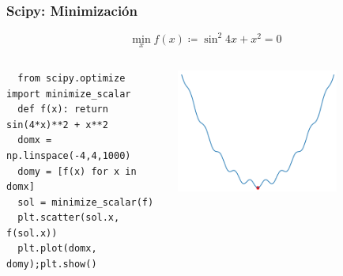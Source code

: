 \documentclass[14pt,aspectratio=169,xcolor=dvipsnames]{beamer}
\begin{document}
\begin{frame}[t,fragile]\frametitle{Scipy: Minimización}
    \begin{small}
    $$ \min_ x f(x) \coloneqq \sin^2 4x + x^2  = 0  $$
    \vspace{-0.5cm}
    \begin{columns}
        \begin{column}{0.49\textwidth}
    \begin{verbatim}  
  from scipy.optimize import minimize_scalar 
  def f(x): return sin(4*x)**2 + x**2
  domx = np.linspace(-4,4,1000)
  domy = [f(x) for x in domx]
  sol = minimize_scalar(f)
  plt.scatter(sol.x, f(sol.x))
  plt.plot(domx, domy);plt.show()
    \end{verbatim}
        \end{column}
        \begin{column}{0.5\textwidth}
            \begin{flushright}
                \includegraphics[width=0.7\textwidth]{../images/scipy-min.png}
            \end{flushright}
        \end{column}
    \end{columns}
    \end{small}
\end{frame}
\end{document}
